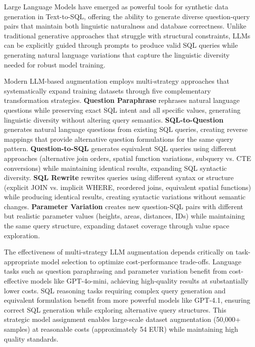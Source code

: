 Large Language Models have emerged as powerful tools for synthetic data generation in Text-to-SQL, offering the ability to generate diverse question-query pairs that maintain both linguistic naturalness and database correctness. Unlike traditional generative approaches that struggle with structural constraints, LLMs can be explicitly guided through prompts to produce valid SQL queries while generating natural language variations that capture the linguistic diversity needed for robust model training.

Modern LLM-based augmentation employs multi-strategy approaches that systematically expand training datasets through five complementary transformation strategies. \textbf{Question Paraphrase} rephrases natural language questions while preserving exact SQL intent and all specific values, generating linguistic diversity without altering query semantics. \textbf{SQL-to-Question} generates natural language questions from existing SQL queries, creating reverse mappings that provide alternative question formulations for the same query pattern. \textbf{Question-to-SQL} generates equivalent SQL queries using different approaches (alternative join orders, spatial function variations, subquery vs. CTE conversions) while maintaining identical results, expanding SQL syntactic diversity. \textbf{SQL Rewrite} rewrites queries using different syntax or structure (explicit JOIN vs. implicit WHERE, reordered joins, equivalent spatial functions) while producing identical results, creating syntactic variations without semantic changes. \textbf{Parameter Variation} creates new question-SQL pairs with different but realistic parameter values (heights, areas, distances, IDs) while maintaining the same query structure, expanding dataset coverage through value space exploration.

The effectiveness of multi-strategy LLM augmentation depends critically on task-appropriate model selection to optimize cost-performance trade-offs. Language tasks such as question paraphrasing and parameter variation benefit from cost-effective models like GPT-4o-mini, achieving high-quality results at substantially lower costs. SQL reasoning tasks requiring complex query generation and equivalent formulation benefit from more powerful models like GPT-4.1, ensuring correct SQL generation while exploring alternative query structures. This strategic model assignment enables large-scale dataset augmentation (50,000+ samples) at reasonable costs (approximately 54 EUR) while maintaining high quality standards.

